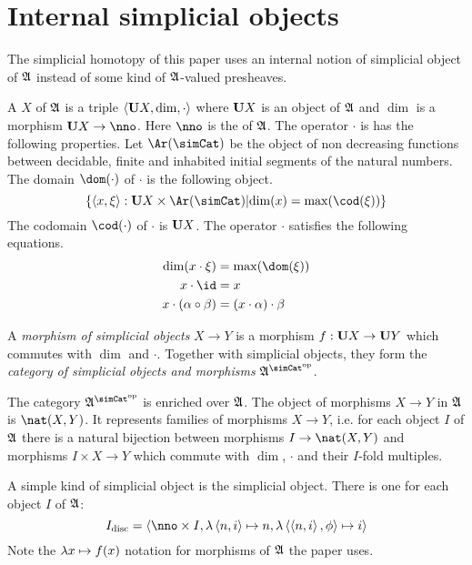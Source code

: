 \documentclass[csh.tex]{subfiles}
\begin{document}
\section{Internal simplicial objects}
The simplicial homotopy of this paper uses an internal notion of simplicial object of $\mathfrak A$ instead of some kind of $\mathfrak A$-valued presheaves.

\begin{definition} A  $X$ of $\mathfrak A$ is a triple $\left\langle \mathbf{U} X, \dim, \cdot \right\rangle$ where $\mathbf{U} X$ is an object of $\mathfrak A$ and $\dim$ is a morphism $\base X\to \nno$. Here $\nno$ is the  of $\mathfrak A$. The operator $\cdot$ is has the following properties. Let $\Ar(\simCat)$ be the object of non decreasing functions between decidable, finite and inhabited initial segments of the natural numbers. The domain $\dom(\cdot)$ of $\cdot$ is the following object. 
\[ \set{\tuplet{x,\xi}\of \base X\times \Ar(\simCat)\middle| \dim(x) = \max(\cod(\xi))}\]
The codomain $\cod(\cdot)$ of $\cdot$ is $\mathbf{U} X$. The operator $\cdot$ satisfies the following equations.
\begin{align*}
\dim(x\cdot\xi) &= \max(\dom(\xi))\\
x\cdot \id &= x \\
x\cdot(\alpha\circ\beta)&=(x\cdot\alpha)\cdot\beta 
\end{align*}

A \emph{morphism of simplicial objects} $X\to Y$ is a morphism $f:\mathbf{U} X\to\mathbf{U} Y$ which commutes with $\dim$ and $\cdot$. Together with simplicial objects, they form the \emph{category of simplicial objects and morphisms} $\ambient\s$.

The category $\ambient\s$ is enriched over $\mathfrak A$. The object of morphisms $X\to Y$ in $\mathfrak A$ is $\nat(X,Y)$. It represents families of morphisms $X\to Y$, i.e. for each object $I$ of $\mathfrak A$ there is a natural bijection between morphisms $I\to \nat(X,Y)$ and morphisms $I\times X\to Y$ which commute with $\dim$, $\cdot$ and their $I$-fold multiples.
\end{definition}

\begin{example} A simple kind of simplicial object is the  simplicial object. There is one for each object $I$ of $\mathfrak A$: 
\[ I\disc = \tuplet{\nno\times I,\function{\tuplet{n,i}}n,\function{\tuplet{\tuplet{n,i},\phi}}i} \]
Note the $\lambda x \mapsto f(x)$ notation for morphisms of $\mathfrak A$ the paper uses.
\end{example}
\end{document}
